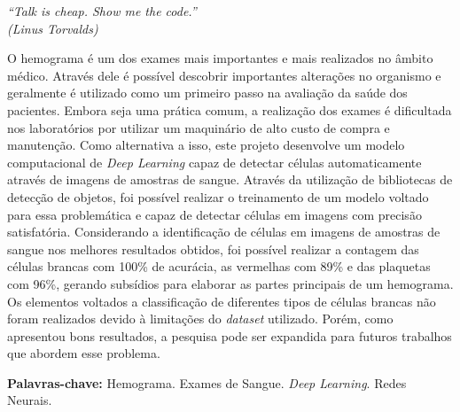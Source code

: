 \documentclass[
	10pt,				%
	oneside,
	a4paper,			%
	chapter=TITLE,		%
	english,			%
	brazil				%
	]{abntex2}
\begin{document}
\begin{epigrafe}
    \vspace*{\fill}
	\begin{flushright}
		\textit{``Talk is cheap. Show me the code.''\\
		(Linus Torvalds)}
	\end{flushright}
\end{epigrafe}

\setlength{\absparsep}{18pt} %
\begin{resumo}
    O hemograma é um dos exames mais importantes e mais realizados no âmbito médico. Através dele é possível descobrir importantes alterações no organismo e geralmente é utilizado como um primeiro passo na avaliação da saúde dos pacientes. Embora seja uma prática comum, a realização dos exames é dificultada nos laboratórios por utilizar um maquinário de alto custo de compra e manutenção. Como alternativa a isso, este projeto desenvolve um modelo computacional de \emph{Deep Learning} capaz de detectar células automaticamente através de imagens de amostras de sangue. Através da utilização de bibliotecas de detecção de objetos, foi possível realizar o treinamento de um modelo voltado para essa problemática e capaz de detectar células em imagens com precisão satisfatória. Considerando a identificação de células em imagens de amostras de sangue nos melhores resultados obtidos, foi possível realizar a contagem das células brancas com 100\% de acurácia, as vermelhas com 89\% e das plaquetas com 96\%, gerando subsídios para elaborar as partes principais de um hemograma. Os elementos voltados a classificação de diferentes tipos de células brancas não foram realizados devido à limitações do \emph{dataset} utilizado. Porém, como apresentou bons resultados, a pesquisa pode ser expandida para futuros trabalhos que abordem esse problema.
	
	\textbf{Palavras-chave:} Hemograma. Exames de Sangue. \emph{Deep Learning}. Redes Neurais.
\end{resumo}
\end{document}
